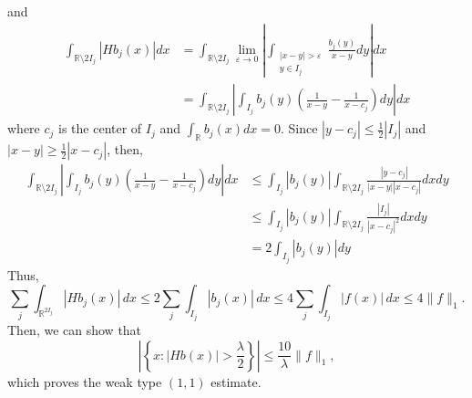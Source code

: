 \documentclass[12pt,openany]{book}
\theoremstyle{definition}
\begin{document}
and
$$
\begin{aligned}
\int_{\mathbb{R} \setminus 2I_j}|Hb_j(x)| dx &= \int_{\mathbb{R} \setminus 2I_j} \lim_{\varepsilon \rightarrow 0} \left| \int_{\substack{|x-y|>\varepsilon \\ y \in I_j}} \frac{b_j(y)}{x-y} dy \right| dx \\
&= \int_{\mathbb{R} \setminus 2I_j} \left| \int_{I_j} b_j(y) \left( \frac{1}{x-y} - \frac{1}{x-c_j} \right) dy \right| dx
\end{aligned}
$$
where $c_j$ is the center of $I_j$ and $\int_{\mathbb{R}} b_j(x) dx = 0$. Since $|y -c_j| \leq \frac{1}{2} |I_j|$ and $|x-y| \geq \frac{1}{2} |x-c_j|$, then,
$$
\begin{aligned}
\int_{\mathbb{R} \setminus 2I_j} \left| \int_{I_j} b_j(y) \left( \frac{1}{x-y} - \frac{1}{x-c_j} \right) dy \right| dx &\leq \int_{I_j} |b_j(y)| \int_{\mathbb{R} \setminus 2I_j} \frac{|y-c_j|}{|x-y||x-c_j|} dx dy \\
&\leq \int_{I_j} |b_j(y)| \int_{\mathbb{R} \setminus 2I_j} \frac{|I_j|}{|x-c_j|^2} dx dy \\
&= 2 \int_{I_j} |b_j(y)| dy
\end{aligned}
$$
Thus,
\[  
\sum_j \int_{\mathbb{R}^{2I_j}} |Hb_j(x)| \, dx \leqslant 2 \sum_j \int_{I_j} |b_j(x)| \, dx \leqslant 4 \sum_j \int_{I_j} |f(x)| \, dx \leqslant 4\|f\|_1.  
\]  
Then, we can show that  
\[  
\left|\left\{ x : |Hb(x)| > \frac{\lambda}{2} \right\}\right| \leq \frac{10}{\lambda}\|f\|_1,  
\]  
which proves the weak type $(1,1)$ estimate. \\ 
  
\end{document}
